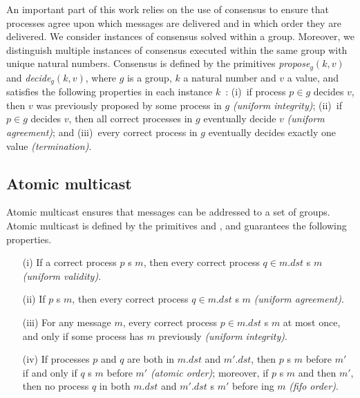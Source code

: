 \documentclass[times, 10pt]{article}
\begin{document}
An important part of this work relies on the use of consensus to ensure that processes agree upon which messages are delivered and in which order they are delivered. We consider instances of consensus solved within a group. Moreover, we distinguish multiple instances of consensus executed within the same group with unique natural numbers.
Consensus is defined by the primitives \textit{propose$_g(k, v)$} and \textit{decide$_g(k, v)$}, where $g$ is a group, $k$ a natural number and $v$ a value, and satisfies the following properties in each instance $k$~\cite{hadzilacos1993ftb}:
(i)~if process $p \in g$ decides $v$, then $v$ was previously proposed by some process in $g$ \emph{(uniform integrity)}; 
(ii)~if $p \in g$ decides $v$, then all correct processes in $g$ eventually decide $v$ \emph{(uniform agreement)}; and 
(iii)~every correct process in $g$ eventually decides exactly one value \emph{(termination)}.


\subsection{Atomic multicast}

Atomic multicast ensures that messages can be addressed to a set of groups. %
Atomic multicast is defined by the primitives  and , and guarantees the following properties.

\begin{itemize}
\item[(i)] If a correct process $p$ \amcast{}s $m$, then every correct process $q \in m.dst$ \amdel{}s $m$ \emph{(uniform validity)}.

\item[(ii)] If $p$ \amdel{}s $m$, then every correct process $q \in m.dst$ \amdel{}s $m$ \emph{(uniform agreement)}.

\item[(iii)] For any message $m$, every correct process $p \in m.dst$ \amdel{}s $m$ at most once, and only if some process has \amcast{} $m$ previously \emph{(uniform integrity)}.

\item[(iv)] If processes $p$ and $q$ are both in $m.dst$ and $m'.dst$, then $p$ \amdel{}s $m$ before $m'$ if and only if $q$ \amdel{}s $m$ before $m'$ \emph{(atomic order)}; moreover, if $p$ \amcast{}s $m$ and then $m'$, then no process $q$ in both $m.dst$ and $m'.dst$ \amdel{}s $m'$ before \amdel{}ing $m$ \emph{(fifo order)}.
\end{itemize} 
\end{document}
